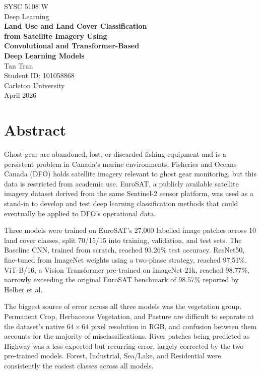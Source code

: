 \documentclass[12pt, letterpaper]{article}
\begin{document}
\begin{titlepage}
    \centering
    \vspace*{2cm}
    {\large SYSC 5108 W}\\[0.3cm]
    {\large Deep Learning}\\[1.5cm]
    {\LARGE \textbf{Land Use and Land Cover Classification\\[0.3cm]
    from Satellite Imagery Using\\[0.3cm]
    Convolutional and Transformer-Based\\[0.3cm]
    Deep Learning Models}}\\[2cm]
    {\large Tan Tran}\\[0.2cm]
    {\normalsize Student ID: 101058868}\\[0.3cm]
    {\normalsize Carleton University}\\[2cm]
    {\normalsize April 2026}
\end{titlepage}

\newpage
\section*{Abstract}

Ghost gear are abandoned, lost, or discarded fishing equipment and is a persistent problem in Canada's marine environments. Fisheries and Oceans Canada (DFO) holds satellite imagery relevant to ghost gear monitoring, but this data is restricted from academic use. EuroSAT, a publicly available satellite imagery dataset derived from the same Sentinel-2 sensor platform, was used as a stand-in to develop and test deep learning classification methods that could eventually be applied to DFO's operational data.

Three models were trained on EuroSAT's 27,000 labelled image patches across 10 land cover classes, split 70/15/15 into training, validation, and test sets. The Baseline CNN, trained from scratch, reached 93.26\% test accuracy. ResNet50, fine-tuned from ImageNet weights using a two-phase strategy, reached 97.51\%. ViT-B/16, a Vision Transformer pre-trained on ImageNet-21k, reached 98.77\%, narrowly exceeding the original EuroSAT benchmark of 98.57\% reported by Helber et al.

The biggest source of error across all three models was the vegetation group.
Permanent Crop, Herbaceous Vegetation, and Pasture are difficult to separate at the dataset's native $64 \times 64$ pixel resolution in RGB, and confusion between them accounts for the majority of misclassifications. River patches being predicted as Highway was a less expected but recurring error, largely corrected by the two pre-trained models. Forest, Industrial, Sea/Lake, and Residential were consistently the easiest classes across all models.
\end{document}
